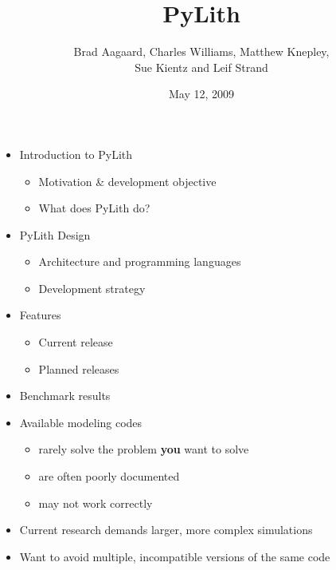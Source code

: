 \documentclass[pdftex,cig,slideColor]{pp4slides}
\title{PyLith}
\subtitle{}
\author{Brad Aagaard, Charles Williams, Matthew Knepley, \\[10pt]
  Sue Kientz and Leif Strand}
\date{May 12, 2009}
\begin{document}
\maketitle
\vfill

  \summary{}  

  \begin{itemize}
  \item Introduction to PyLith
    \begin{itemize}
    \item Motivation \& development objective
    \item What does PyLith do?
    \end{itemize}
  \item PyLith Design
    \begin{itemize}
    \item Architecture and programming languages
    \item Development strategy
    \end{itemize}
  \item Features
    \begin{itemize}
    \item Current release
    \item Planned releases
    \end{itemize}
  \item Benchmark results
  \end{itemize}


  \summary{}
  
  \begin{itemize}
  \item Available modeling codes
    \begin{itemize}
    \item rarely solve the problem {\bf you} want to solve
    \item are often poorly documented
    \item may not work correctly
    \end{itemize}
  \item Current research demands larger, more complex simulations
  \item Want to avoid multiple, incompatible versions of the same code
  \end{itemize}
\end{document}
